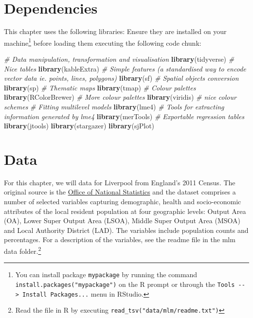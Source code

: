 \documentclass[
]{book}
\newenvironment{Shaded}{\begin{snugshade}}{\end{snugshade}}
\newcommand{\CommentTok}[1]{\textcolor[rgb]{0.56,0.35,0.01}{\textit{#1}}}
\newcommand{\KeywordTok}[1]{\textcolor[rgb]{0.13,0.29,0.53}{\textbf{#1}}}
\newcommand{\NormalTok}[1]{#1}
\begin{document}
\hypertarget{dependencies-4}{%
\section{Dependencies}\label{dependencies-4}}

This chapter uses the following libraries: Ensure they are installed on your machine\footnote{You can install package \texttt{mypackage} by running the command \texttt{install.packages("mypackage")} on the R prompt or through the \texttt{Tools\ -\/-\textgreater{}\ Install\ Packages...} menu in RStudio.} before loading them executing the following code chunk:

\begin{Shaded}
\begin{Highlighting}[]
\CommentTok{# Data manipulation, transformation and visualisation}
\KeywordTok{library}\NormalTok{(tidyverse)}
\CommentTok{# Nice tables}
\KeywordTok{library}\NormalTok{(kableExtra)}
\CommentTok{# Simple features (a standardised way to encode vector data ie. points, lines, polygons)}
\KeywordTok{library}\NormalTok{(sf) }
\CommentTok{# Spatial objects conversion}
\KeywordTok{library}\NormalTok{(sp) }
\CommentTok{# Thematic maps}
\KeywordTok{library}\NormalTok{(tmap) }
\CommentTok{# Colour palettes}
\KeywordTok{library}\NormalTok{(RColorBrewer) }
\CommentTok{# More colour palettes}
\KeywordTok{library}\NormalTok{(viridis) }\CommentTok{# nice colour schemes}
\CommentTok{# Fitting multilevel models}
\KeywordTok{library}\NormalTok{(lme4)}
\CommentTok{# Tools for extracting information generated by lme4}
\KeywordTok{library}\NormalTok{(merTools)}
\CommentTok{# Exportable regression tables}
\KeywordTok{library}\NormalTok{(jtools)}
\KeywordTok{library}\NormalTok{(stargazer)}
\KeywordTok{library}\NormalTok{(sjPlot)}
\end{Highlighting}
\end{Shaded}

\hypertarget{data-3}{%
\section{Data}\label{data-3}}

For this chapter, we will data for Liverpool from England's 2011 Census. The original source is the \href{https://www.nomisweb.co.uk/home/census2001.asp}{Office of National Statistics} and the dataset comprises a number of selected variables capturing demographic, health and socio-economic attributes of the local resident population at four geographic levels: Output Area (OA), Lower Super Output Area (LSOA), Middle Super Output Area (MSOA) and Local Authority District (LAD). The variables include population counts and percentages. For a description of the variables, see the readme file in the mlm data folder.\footnote{Read the file in R by executing \texttt{read\_tsv("data/mlm/readme.txt")}}
\end{document}
